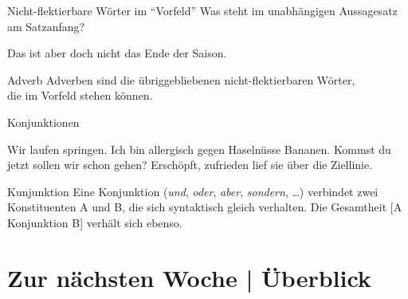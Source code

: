 \begin{frame}
  {Nicht-flektierbare Wörter im "`Vorfeld"'}
  \pause
  Was steht im unabhängigen Aussagesatz am Satzanfang?\\
  \pause
  {}
  \pause
  \begin{exe}
    \ex\label{ex:adverbenadkopulasundpartikeln038}
    \begin{xlist}
      \pause
      \pause
      \pause
      \pause
      \pause
      \pause
      \pause
      \pause
      \pause
      \pause
    \end{xlist}
    \ex\label{ex:adverbenadkopulasundpartikeln044} Das ist aber \alert{doch} nicht das Ende der Saison.
  \end{exe}
  \pause
  \Viertelzeile
  \begin{block}{Adverb}
    Adverben sind die übriggebliebenen nicht-flektierbaren Wörter,\\
    die im Vorfeld stehen können.
  \end{block}
\end{frame}


\begin{frame}
  {Konjunktionen}
  \onslide<+->
  \onslide<+->
  \begin{exe}
    \ex
    \begin{xlist}
      \ex Wir \alert{laufen}  \alert{springen}.
      \ex Ich bin allergisch gegen \alert{Haselnüsse}  \alert{Bananen}.
      \ex \alert{Kommst du jetzt}  \alert{sollen wir schon gehen}?
      \ex \alert{Erschöpft},  \alert{zufrieden} lief sie über die Ziellinie.
    \end{xlist}
  \end{exe}
  \Zeile
  \onslide<+->
  \begin{block}{Kunjunktion}
    Eine Konjunktion (\textit{und}, \textit{oder}, \textit{aber}, \textit{sondern}, \ldots) verbindet zwei Konstituenten A und B, die sich syntaktisch gleich verhalten. Die Gesamtheit [A Konjunktion B] verhält sich ebenso.
  \end{block}
\end{frame}


\ifdefined\TITLE
  \section{Zur nächsten Woche | Überblick}

